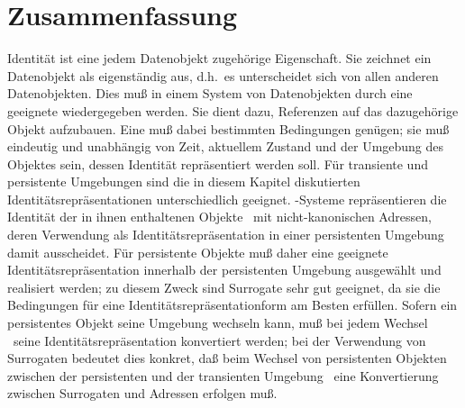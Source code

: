 \section{Zusammenfassung}
%
Identit\"{a}t ist eine jedem Datenobjekt zugeh\"{o}rige Eigenschaft. Sie
zeichnet ein Datenobjekt als eigenst\"{a}ndig aus, d.h.\ es unterscheidet
sich von allen anderen Datenobjekten. Dies mu\ss{} in einem System von
Datenobjekten durch eine geeignete \representationform{} wiedergegeben
werden. Sie dient dazu, Referenzen auf das dazugeh\"{o}rige Objekt
aufzubauen. Eine \representationform{} mu\ss{} dabei bestimmten
Bedingungen gen\"{u}gen; sie mu\ss{} eindeutig und unabh\"{a}ngig von Zeit,
aktuellem Zustand und der Umgebung des Objektes sein, dessen
Identit\"{a}t repr\"{a}sentiert werden soll. F\"{u}r transiente und persistente
Umgebungen sind die in diesem Kapitel diskutierten
Iden\-ti\-t\"{a}ts\-re\-pr\"{a}\-sen\-ta\-tio\-nen unterschiedlich
geeignet. \clos-Systeme repr\"{a}sentieren die Identit\"{a}t der in ihnen
enthaltenen Objekte
\ia\ mit nicht-kanonischen Adressen, deren Verwendung als
Identit\"{a}tsrepr\"{a}sentation in einer persistenten Umgebung damit
ausscheidet.  F\"{u}r persistente Objekte mu\ss{} daher eine geeignete
Identit\"{a}tsrepr\"{a}sentation innerhalb der persistenten Umgebung
ausgew\"{a}hlt und realisiert werden; zu diesem Zweck sind Surrogate sehr
gut geeignet, da sie die Bedingungen f\"{u}r eine
Identit\"{a}tsrepr\"{a}sentationform am Besten erf\"{u}llen.  Sofern ein
persistentes Objekt seine Umgebung wechseln kann, mu\ss{}
bei jedem Wechsel \ua\ seine Identit\"{a}tsrepr\"{a}sentation konvertiert
werden; bei der Verwendung von Surrogaten bedeutet dies konkret, da\ss{}
beim Wechsel von persistenten Objekten zwischen der persistenten und
der transienten Umgebung \ua\ eine Konvertierung zwischen Surrogaten
und Adressen erfolgen mu\ss{}.

